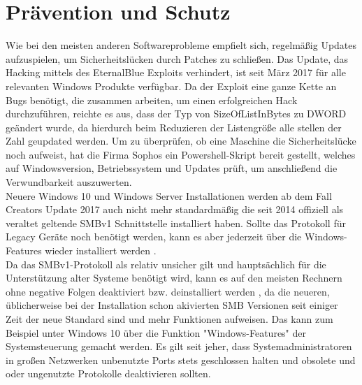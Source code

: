 \documentclass[DIV=12,headings=normal,pdftex,headinclude=false,footinclude=false,final]{scrreprt}
\begin{document}
\chapter{Prävention und Schutz}
Wie bei den meisten anderen Softwareprobleme empfielt sich, regelmäßig Updates aufzuspielen, um Sicherheitslücken durch Patches zu schließen. Das Update, das Hacking mittels des EternalBlue Exploits verhindert, ist seit März 2017 für alle relevanten Windows Produkte verfügbar.
Da der Exploit eine ganze Kette an Bugs benötigt, die zusammen arbeiten, um einen erfolgreichen Hack durchzuführen, reichte es aus, dass der Typ von SizeOfListInBytes zu DWORD geändert wurde\cite{Scad:EB}, da hierdurch beim Reduzieren der Listengröße alle stellen der Zahl geupdated werden.
Um zu überprüfen, ob eine Maschine die Sicherheitslücke noch aufweist, hat die Firma Sophos ein Powershell-Skript bereit gestellt, welches auf Windowsversion, Betriebssystem und Updates prüft, um anschließend die Verwundbarkeit auszuwerten\cite{SAV}.\\
Neuere Windows 10 und Windows Server Installationen werden ab dem Fall Creators Update 2017 auch nicht mehr standardmäßig die seit 2014 offiziell als veraltet geltende SMBv1 Schnittstelle installiert haben. Sollte das Protokoll für Legacy Geräte noch benötigt werden, kann es aber jederzeit über die Windows-Features wieder installiert werden \cite{MS:Fix}.\\
Da das SMBv1-Protokoll als relativ unsicher gilt und hauptsächlich für die Unterstützung alter Systeme benötigt wird, kann es auf den meisten Rechnern ohne negative Folgen deaktiviert bzw. deinstalliert werden \cite{WP}, da die neueren, üblicherweise bei der Installation schon akivierten SMB Versionen  seit einiger Zeit der neue Standard sind und mehr Funktionen aufweisen. Das kann zum Beispiel unter Windows 10 über die Funktion "Windows-Features" der Systemsteuerung gemacht werden. Es gilt seit jeher, dass Systemadministratoren in großen Netzwerken unbenutzte Ports stets geschlossen halten und obsolete und oder ungenutzte Protokolle deaktivieren sollten.\cite{TM:EB}
\end{document}
